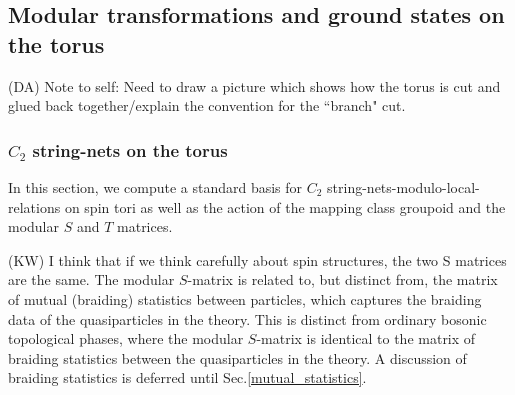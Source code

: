 \documentclass[12pt,a4paper]{article}
\newcommand{\tp}{\otimes}
\newcommand{\unit}{\mathds{1}}
\newcommand{\cc}{\mathbb{C}}
\newcommand{\mcz}{\mathcal{Z}}
\newcommand{\mca}{\mathcal{A}}
\newcommand{\mcv}{\mathcal{V}}
\newcommand{\tube}{\textbf{Tube}}
\newcommand{\kw}[1]{{\color{kwcolor}\footnotesize{(KW) #1}}}
\newcommand{\dave}[1]{{\color{ao(english)}\footnotesize{(DA) #1}}}
\begin{document}
\begin{table}
 
\caption{ \label{fusiontable} The fusion rules in $\tube(C_2)$. 
	\kw{not clear what $\mcz$ means when spin structures are in play.  Probably we should drop reference to $\mcz$. \dave{Sounds good. Removed $\mcz$.}}
	We have defined $\mca = \{ m_\unit, m_\sigma^+, m_\psi \} $ and $\mcv = \{ q_\unit, q_\sigma, q_\psi \}$ as the set of anyons and set of vortices, respectively.
	The ($a$-$b$)th entry in each table is the sum $\oplus_c \Delta_c^{ab} c$, where we have omitted any $\Delta^{ab}_c$ that is equal to $\cc$ and used $\bullet = \mathbb{C}^{1|1}$ to signify that the associated $\Delta^{ab}_c$ is isomorphic to $\cc^{1|1}$.
		Entries with $\cc^{0|1}$ indicate that the fusion channel is purely odd. 
	The fusion spaces can be obtained from this table according to $V^{ab}_c \cong \Delta^{ab}_c \tp \text{End}(c)$.
	For example, $V^{m_\psi q_\sigma}_{q_\sigma} \cong \cc \tp \cc^{1|1} = \cc^{1|1}$.
	}
\end{table}






\subsection{Modular transformations and ground states on the torus} \label{modulartforms}
\dave{Note to self: Need to draw a picture which shows how the torus is cut and glued back 
together/explain the convention for the ``branch" cut.}


\subsubsection{$C_2$ string-nets on the torus} \label{c2_stringnets_torus}

In this section, we compute a standard basis for $C_2$ string-nets-modulo-local-relations on spin tori as well 
as the action of the mapping class groupoid and the modular $S$ and $T$ matrices.

\kw{I think that if we think carefully about spin structures, the two S matrices are the same.}
The modular $S$-matrix is related to, but distinct from, the matrix of mutual (braiding) statistics between particles, which 
captures the braiding data of the quasiparticles in the theory.
This is distinct from ordinary bosonic topological phases, where the modular $S$-matrix is identical to the matrix of 
braiding statistics between the quasiparticles in the theory. 
A discussion of braiding statistics is deferred until Sec.\ref{mutual_statistics}. 
\end{document}
